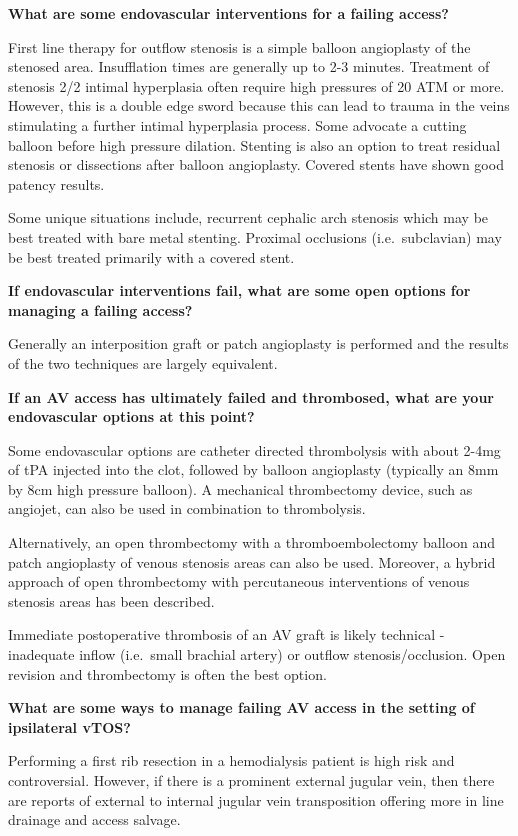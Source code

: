 \documentclass[
]{book}
\begin{document}
\textbf{What are some endovascular interventions for a failing access?}

First line therapy for outflow stenosis is a simple balloon angioplasty
of the stenosed area.\citep{berman2001} Insufflation times are generally up
to 2-3 minutes. Treatment of stenosis 2/2 intimal hyperplasia often
require high pressures of 20 ATM or more. However, this is a double edge
sword because this can lead to trauma in the veins stimulating a further
intimal hyperplasia process. Some advocate a cutting balloon before high
pressure dilation. Stenting is also an option to treat residual stenosis
or dissections after balloon angioplasty. Covered stents have shown good
patency results.

Some unique situations include, recurrent cephalic arch stenosis which
may be best treated with bare metal stenting.\citep{shemesh2008} Proximal
occlusions (i.e.~subclavian) may be best treated primarily with a
covered stent.\citep{agarwal2015, anaya-ayala2011}

\textbf{If endovascular interventions fail, what are some open options for
managing a failing access?}

Generally an interposition graft or patch angioplasty is performed and
the results of the two techniques are largely equivalent.

\textbf{If an AV access has ultimately failed and thrombosed, what are your
endovascular options at this point?}

Some endovascular options are catheter directed thrombolysis with about
2-4mg of tPA injected into the clot, followed by balloon angioplasty
(typically an 8mm by 8cm high pressure balloon). A mechanical
thrombectomy device, such as angiojet, can also be used in combination
to thrombolysis.

Alternatively, an open thrombectomy with a thromboembolectomy balloon
and patch angioplasty of venous stenosis areas can also be used.
Moreover, a hybrid approach of open thrombectomy with percutaneous
interventions of venous stenosis areas has been described.

Immediate postoperative thrombosis of an AV graft is likely technical -
inadequate inflow (i.e.~small brachial artery) or outflow
stenosis/occlusion. Open revision and thrombectomy is often the best
option.\citep{paulson2002}

\textbf{What are some ways to manage failing AV access in the setting of
ipsilateral vTOS?}

Performing a first rib resection in a hemodialysis patient is high risk
and controversial. However, if there is a prominent external jugular
vein, then there are reports of external to internal jugular vein
transposition offering more in line drainage and access
salvage.\citep{degiovanni2020}
\end{document}

